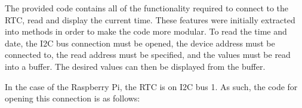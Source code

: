 The provided code contains all of the functionality required to connect to the
RTC, read and display the current time. These features were initially extracted
into methods in order to make the code more modular. To read the time and date,
the I2C bus connection must be opened, the device address must be connected to,
the read address must be specified, and the values must be read into a buffer.
The desired values can then be displayed from the buffer.

In the case of the Raspberry Pi, the RTC is on I2C bus 1. As such, the code for
opening this connection is as follows:

